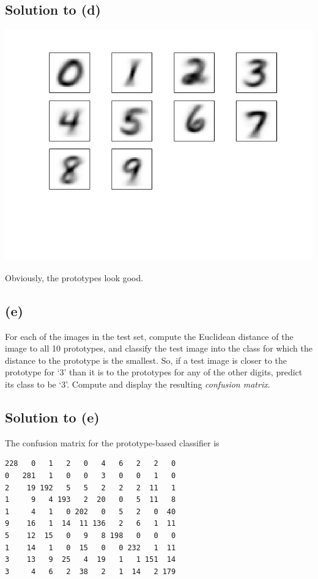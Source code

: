 \documentclass[10pt]{article}
\begin{document}
\subsection*{Solution to (d)}
\begin{center}
\includegraphics[scale=0.5]{MNISTPrototypes}
\end{center}
Obviously, the prototypes look good.

\subsection*{(e)}
\color{blue}
For each of the images in the test set, compute the Euclidean distance of the image to all 10 prototypes, and classify the test image into the class for which the distance to the prototype is the smallest.  So, if a test image is closer to the prototype for `3' than it is to the prototypes for any of the other digits, predict its class to be `3'.  Compute and display the resulting
\textit{confusion matrix}.
\color{black}

\subsection*{Solution to (e)}
The confusion matrix for the prototype-based classifier is
\begin{verbatim}
228   0   1   2   0   4   6   2   2   0
0   281   1   0   0   3   0   0   1   0
2    19 192   5   5   2   2   2  11   1
1     9   4 193   2  20   0   5  11   8
1     4   1   0 202   0   5   2   0  40
9    16   1  14  11 136   2   6   1  11
5    12  15   0   9   8 198   0   0   0
1    14   1   0  15   0   0 232   1  11
3    13   9  25   4  19   1   1 151  14
3     4   6   2  38   2   1  14   2 179
\end{verbatim}
\end{document}
